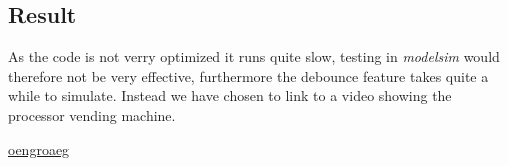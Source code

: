 \subsection{Result}
As the code is not verry optimized it runs quite slow,
testing in \emph{modelsim} would therefore not be very effective,
furthermore the debounce feature takes quite a while to simulate.
Instead we have chosen to link to a video showing the processor vending machine.

\url{oengroaeg}
